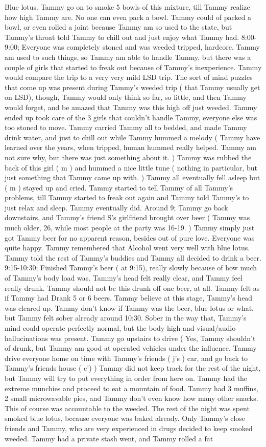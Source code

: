 \documentclass[12pt]{book}
\begin{document}
Blue lotus. Tammy go on to smoke 5 bowls of this mixture, till Tammy realize how high Tammy are. No one can even pack a bowl. Tammy could of packed a bowl, or even rolled a joint because Tammy am so used to the state, but Tammy's throat told Tammy to chill out and just enjoy what Tammy had. 8:00-9:00; Everyone was completely stoned and was weeded tripped, hardcore. Tammy am used to such things, so Tammy am able to handle Tammy, but there was a couple of girls that started to freak out because of Tammy's inexperience. Tammy would compare the trip to a very very mild LSD trip. The sort of mind puzzles that come up was present during Tammy's weeded trip ( that Tammy usually get on LSD), though, Tammy would only think so far, so little, and then Tammy would forget, and be amazed that Tammy was this high off just weeded. Tammy ended up took care of the 3 girls that couldn't handle Tammy, everyone else was too stoned to move. Tammy carried Tammy all to bedded, and made Tammy drink water, and just to chill out while Tammy hummed a melody ( Tammy have learned over the years, when tripped, human hummed really helped. Tammy am not sure why, but there was just something about it. ) Tammy was rubbed the back of this girl ( m ) and hummed a nice little tune ( nothing in particular, but just something that Tammy came up with. ) Tammy all eventually fell asleep but ( m ) stayed up and cried. Tammy started to tell Tammy of all Tammy's problems, till Tammy started to freak out again and Tammy told Tammy's to just relax and sleep. Tammy eventually did. Around 9; Tammy go back downstairs, and Tammy's friend S's girlfriend brought over beer ( Tammy was much older, 26, while most people at the party was 16-19. ) Tammy simply just got Tammy beer for no apparent reason, besides out of pure love. Everyone was quite happy. Tammy remembered that Alcohol went very well with blue lotus. Tammy told the rest of Tammy's buddies and Tammy all decided to drink a beer. 9:15-10:30; Finished Tammy's beer ( at 9:15), really slowly because of how much of Tammy's body load was. Tammy's head felt really clear, and Tammy feel really drunk. Tammy should not be this drunk off one beer, at all. Tammy felt as if Tammy had Drank 5 or 6 beers. Tammy believe at this stage, Tammy's head was cleared up. Tammy don't know if Tammy was the beer, blue lotus or what, but Tammy felt sober already around 10:30. Sober in the way that, Tammy's mind could operate perfectly normal, but the body high and visual/audio hallucinations was present. Tammy go upstairs to drive ( Yes, Tammy shouldn't of drunk, but Tammy am good at operated vehicles under the influence. Tammy drive everyone home on time with Tammy's friends ( j's ) car, and go back to Tammy's friends house ( c') ) Tammy did not keep track for the rest of the night, but Tammy will try to put everything in order from here on. Tammy had the extreme munchies and proceed to eat a mountain of food. Tammy had 3 muffins, 2 small microwavable pies, and Tammy don't even know how many other snacks. This of course was accountable to the weeded. The rest of the night was spent smoked blue lotus, because everyone was baked already. Only Tammy's close friends and Tammy, who are very experienced in drugs decided to keep smoked weeded. Tammy had a private stash went, and Tammy rolled a fat 
\end{document}
